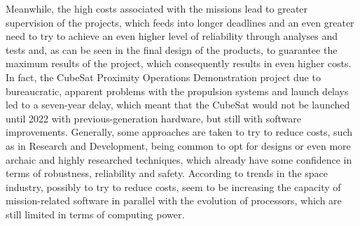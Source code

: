 Meanwhile, the high costs associated with the missions lead to greater supervision of the projects, which feeds into longer deadlines and an even greater need to try to achieve an even higher level of reliability through analyses and tests and, as can be seen in the final design of the products, to guarantee the maximum results of the project, which consequently results in even higher costs. In fact, the CubeSat Proximity Operations Demonstration \cite{spiegel2023cubesat} project due to bureaucratic, apparent problems with the propulsion systems and launch delays led to a seven-year delay, which meant  that the CubeSat would not be launched until 2022 with previous-generation hardware, but still with software improvements. Generally, some approaches are taken to try to reduce costs, such as in Research and Development, being common to opt for designs or even more archaic and highly researched techniques, which already have some confidence in terms of robustness, reliability and safety. According to \cite{wertz2011space} trends in the space industry, possibly to try to reduce costs, seem to be increasing the capacity of mission-related software in parallel with the evolution of processors, which are still limited in terms of computing power. \par


